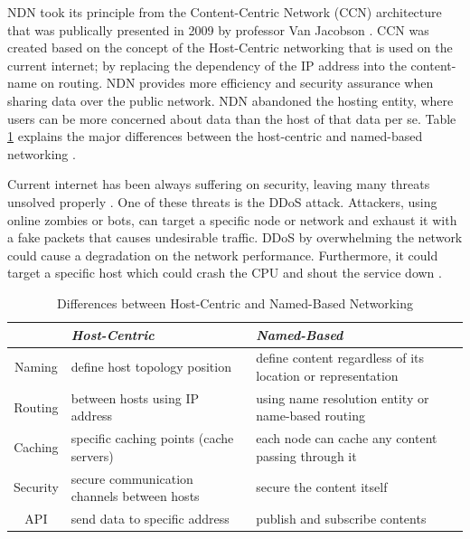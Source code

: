 \documentclass[conference]{IEEEtran}
\begin{document}
NDN took its principle from the Content-Centric Network (CCN) architecture that was publically presented in 2009 by professor Van Jacobson \cite{Jacobson:2009:NNC:1658939.1658941}\cite{Jacobson2012}\cite{Fukuda2009}. CCN was created based on the concept of the Host-Centric networking that is used on the current internet; by replacing the dependency of the IP address into the content-name on routing. NDN provides more efficiency and security assurance when sharing data over the public network. NDN abandoned the hosting entity, where users can be more concerned about data than the host of that data per se. Table \ref{tab1} explains the major differences between the host-centric and named-based networking \cite{Abdallah2015}. 

Current internet has been always suffering on security, leaving many threats unsolved properly \cite{Smetters2009}. One of these threats is the DDoS attack. Attackers, using online zombies or bots, can target a specific node or network and exhaust it with a fake packets that causes undesirable traffic. DDoS by overwhelming the network could cause a degradation on the network performance. Furthermore, it could target a specific host which could crash the CPU and shout the service down \cite{6496396}.

\begin{table}[htbp]
\caption{Differences between Host-Centric and Named-Based Networking}
\begin{center}
\begin{tabular}{|c|p{3cm}|p{3.5cm}|}
\hline
{}&\textbf{\textit{Host-Centric}}& \textbf{\textit{Named-Based}} \\
\hline
{Naming}& define host topology position & define content regardless of its location or representation \\
\hline
{Routing}& between hosts using IP address & using name resolution entity or name-based routing  \\
\hline
{Caching}& specific caching points (cache servers) & each node can cache any content passing through it   \\
\hline
{Security}& secure communication channels between hosts & secure the content itself   \\
\hline
{API}& send data to specific address & publish and subscribe contents  \\
\hline
\end{tabular}
\label{tab1}
\end{center}
\end{table}
\end{document}
